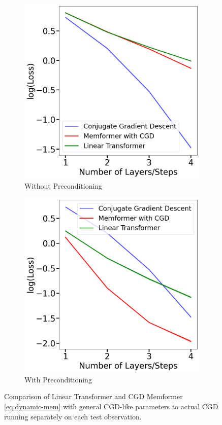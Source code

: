 \documentclass[11pt]{article}
\numberwithin{equation}{section}
\begin{document}
\begin{figure}[!htbp]
  \centering
  \begin{subfigure}[b]{0.45\textwidth}
    \centering
    \includegraphics[width=\textwidth]{cg_without_preconditioning.png}
    \caption{Without Preconditioning}
    \label{fig:cg_without_preconditioning}
  \end{subfigure}
  \hfill
  \begin{subfigure}[b]{0.45\textwidth}
    \centering
    \includegraphics[width=\textwidth]{cg_with_preconditioning.png}
    \caption{With Preconditioning}
    \label{fig:cg_with_preconditioning}
  \end{subfigure}
  \caption{Comparison of Linear Transformer and CGD Memformer \eqref{eq:dynamic-mem} with general CGD-like parameters to actual CGD running separately on each test observation.}
  \label{fig:cg_preconditioning}
\end{figure}
\end{document}
